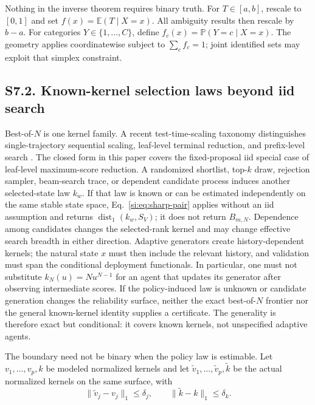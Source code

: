 \documentclass[10pt,twocolumn]{article}
\newcommand{\Prb}{\mathbb{P}}
\newcommand{\E}{\mathbb{E}}
\begin{document}
Nothing in the inverse theorem requires binary truth. For $T\in[a,b]$, rescale to $[0,1]$ and set $f(x)=\E(T\mid X=x)$. All ambiguity results then rescale by $b-a$. For categories $Y\in\{1,\ldots,C\}$, define $f_c(x)=\Prb(Y=c\mid X=x)$. The geometry applies coordinatewise subject to $\sum_cf_c=1$; joint identified sets may exploit that simplex constraint.

\subsection*{S7.2. Known-kernel selection laws beyond iid search}

Best-of-$N$ is one kernel family. A recent test-time-scaling taxonomy distinguishes single-trajectory sequential scaling, leaf-level terminal reduction, and prefix-level search \citep{hariri2026}. The closed form in this paper covers the fixed-proposal iid special case of leaf-level maximum-score reduction. A randomized shortlist, top-$k$ draw, rejection sampler, beam-search trace, or dependent candidate process induces another selected-state law $k_w$. If that law is known or can be estimated independently on the same stable state space, Eq.~\ref{si:eq:sharp-pair} applies without an iid assumption and returns $\operatorname{dist}_1(k_w,S_V)$; it does not return $B_{m,N}$. Dependence among candidates changes the selected-rank kernel and may change effective search breadth in either direction. Adaptive generators create history-dependent kernels; the natural state $x$ must then include the relevant history, and validation must span the conditional deployment functionals. In particular, one must not substitute $k_N(u)=Nu^{N-1}$ for an agent that updates its generator after observing intermediate scores. If the policy-induced law is unknown or candidate generation changes the reliability surface, neither the exact best-of-$N$ frontier nor the general known-kernel identity supplies a certificate. The generality is therefore exact but conditional: it covers known kernels, not unspecified adaptive agents.

The boundary need not be binary when the policy law is estimable. Let $v_1,\ldots,v_p,k$ be modeled normalized kernels and let $\widetilde v_1,\ldots,\widetilde v_p,\widetilde k$ be the actual normalized kernels on the same surface, with
\begin{equation}
\|\widetilde v_j-v_j\|_1\le\delta_j,
\qquad
\|\widetilde k-k\|_1\le\delta_k.
\label{si:eq:kernel-errors}
\end{equation}
\end{document}
